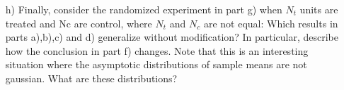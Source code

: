 \documentclass[10pt]{article}
\begin{document}
\begin{enumerate}
\begin{itemize}
\item[h)] Finally, consider the randomized experiment in part g) when $N_t$ units are treated and Nc are control, where $N_t$ and $N_c$ are not equal:  Which results in parts a),b),c) and d) generalize without modification?  In particular, describe how the conclusion in part f) changes.  Note that this is an interesting situation where the asymptotic distributions of sample means are not gaussian.  What are these distributions?
\end{itemize}
\end{enumerate}
\end{document}
